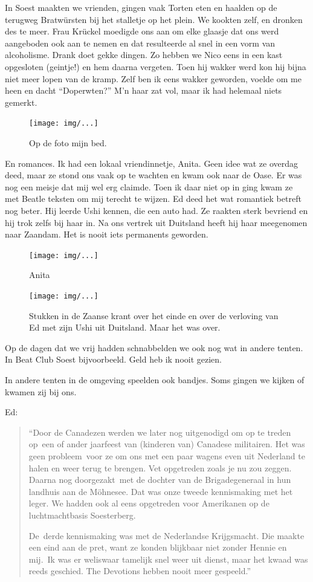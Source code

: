 \documentclass[12pt,twoside]{memoir}
\begin{document}
In Soest maakten we vrienden, gingen vaak Torten eten en haalden op de terugweg Bratwürsten bij het stalletje op het plein. We kookten zelf, en dronken des te meer. Frau Krückel moedigde ons aan om elke glaasje dat ons werd aangeboden ook aan te nemen en dat resulteerde al snel in een vorm van alcoholisme. Drank doet gekke dingen. Zo hebben we Nico eens in een kast opgesloten (geintje!) en hem daarna vergeten. Toen hij wakker werd kon hij bijna niet meer lopen van de kramp. Zelf ben ik eens wakker geworden, voelde om me heen en dacht ``Doperwten?'' M’n haar zat vol, maar ik had helemaal niets gemerkt. 

\begin{figure}[t]
\texttt{[image: img/...]}
\caption{Op de foto mijn bed.}
\end{figure}

En romances. Ik had een lokaal vriendinnetje, Anita. Geen idee wat ze overdag deed, maar ze stond ons vaak op te wachten en kwam ook naar de Oase. Er was nog een meisje dat mij wel erg claimde. Toen ik daar niet op in ging kwam ze met Beatle teksten om mij terecht te wijzen. Ed deed het wat romantiek betreft nog beter. Hij leerde Ushi kennen, die een auto had. Ze raakten sterk bevriend en hij trok zelfs bij haar in. Na ons vertrek uit Duitsland heeft hij haar meegenomen naar Zaandam. Het is nooit iets permanents geworden.

\begin{figure}[t]
\texttt{[image: img/...]}
\caption{Anita}
\end{figure}

\begin{figure}[t]
\texttt{[image: img/...]}
\caption{Stukken in de Zaanse krant over het einde en over de verloving van Ed met zijn Ushi uit Duitsland. Maar het was over.}
\end{figure}

Op de dagen dat we vrij hadden schnabbelden we ook nog wat in andere tenten. In Beat Club Soest bijvoorbeeld. Geld heb ik nooit gezien. 

In andere tenten in de omgeving speelden ook bandjes. Soms gingen we kijken of kwamen zij bij ons. 	

Ed:

\begin{quote}
``Door de Canadezen werden we later nog uitgenodigd om op te treden op een of ander jaarfeest van (kinderen van) Canadese militairen. Het was geen probleem voor ze om ons met een paar wagens even uit Nederland te halen en weer terug te brengen. Vet opgetreden zoals je nu zou zeggen. Daarna nog doorgezakt met de dochter van de Brigadegeneraal in hun landhuis aan de Möhnesee. Dat was onze tweede kennismaking met het leger. We hadden ook al eens opgetreden voor Amerikanen op de luchtmachtbasis Soesterberg. 

De derde kennismaking was met de Nederlandse Krijgsmacht. Die maakte een eind aan de pret, want ze konden blijkbaar niet zonder Hennie en mij. Ik was er weliswaar tamelijk snel weer uit dienst, maar het kwaad was reeds geschied. The Devotions hebben nooit meer gespeeld.'' 
\end{quote}
\end{document}
